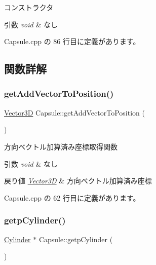 コンストラクタ 


\begin{DoxyParams}{引数}
{\em void} & なし \\
\hline
\end{DoxyParams}


 Capsule.\+cpp の 86 行目に定義があります。



\subsection{関数詳解}
\mbox{\label{class_capsule_a32991dc5e0331f716302ce73a8f9fd2f}} 
\subsubsection{\texorpdfstring{get\+Add\+Vector\+To\+Position()}{getAddVectorToPosition()}}
{\footnotesize\ttfamily \mbox{\hyperlink{class_vector3_d}{Vector3D}} Capsule\+::get\+Add\+Vector\+To\+Position (\begin{DoxyParamCaption}{ }\end{DoxyParamCaption})}



方向ベクトル加算済み座標取得関数 


\begin{DoxyParams}{引数}
{\em void} & なし \\
\hline
\end{DoxyParams}

\begin{DoxyRetVals}{戻り値}
{\em \mbox{\hyperlink{class_vector3_d}{Vector3D}}} & 方向ベクトル加算済み座標 \\
\hline
\end{DoxyRetVals}


 Capsule.\+cpp の 62 行目に定義があります。

\mbox{\label{class_capsule_a86fceb506f99d999cec56a5c316a5c7a}} 
\subsubsection{\texorpdfstring{getp\+Cylinder()}{getpCylinder()}}
{\footnotesize\ttfamily \mbox{\hyperlink{class_cylinder}{Cylinder}} $\ast$ Capsule\+::getp\+Cylinder (\begin{DoxyParamCaption}{ }\end{DoxyParamCaption})}



